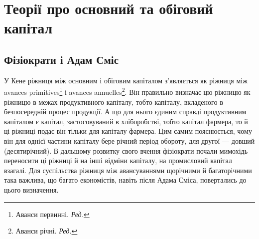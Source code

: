 
\section{Теорії про основний та обіговий капітал}

\subsection{Фізіократи і Адам Сміс}

У Кене ріжниця між основним і обіговим капіталом з’являється як
ріжниця між avances primitives\footnote*{
Аванси первинні. \emph{Ред.}
} і avances annuelles\footnote*{
Аванси річні. \emph{Ред.}
}. Він правильно визначає
цю ріжницю як ріжницю в межах продуктивного капіталу, тобто
капіталу, вкладеного в безпосередній процес продукції. А що для нього
єдиним справді продуктивним капіталом є капітал, застосовуваний в хліборобстві,
тобто капітал фармера, то й ці ріжниці подає він тільки для
капіталу фармера. Цим самим пояснюється, чому він для однієї частини
капіталу бере річний період обороту, для другої — довший (десятирічний).
В дальшому розвитку свого вчення фізіократи почали мимохідь переносити
ці ріжниці й на інші відміни капіталу, на промисловий капітал взагалі.
Для суспільства ріжниця між авансуваннями щорічними й багаторічними
така важлива, що багато економістів, навіть після Адама Сміса,
повертались до цього визначення.

